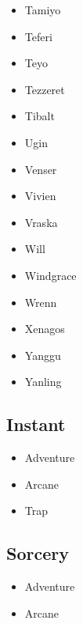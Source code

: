 \documentclass{article}
\begin{document}
\begin{multicols}{3}
\begin{itemize}
        \item Tamiyo
        \item Teferi
        \item Teyo
        \item Tezzeret
        \item Tibalt
        \item Ugin
        \item Venser
        \item Vivien
        \item Vraska
        \item Will
        \item Windgrace
        \item Wrenn
        \item Xenagos
        \item Yanggu
        \item Yanling
    \end{itemize}
\end{multicols}
\subsection{Instant}
\begin{multicols}{3}
    \begin{itemize}
        \item Adventure
        \item Arcane
        \item Trap
    \end{itemize}
\end{multicols}
\subsection{Sorcery}
\begin{multicols}{3}
    \begin{itemize}
        \item Adventure
        \item Arcane
    \end{itemize}
\end{multicols}
\end{document}
